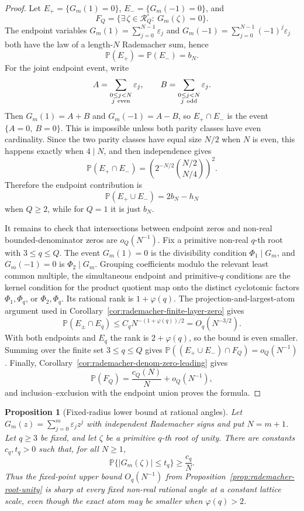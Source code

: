 \documentclass[11pt]{amsart}
\numberwithin{equation}{section}
\newtheorem{proposition}[theorem]{Proposition}
\theoremstyle{definition}
\theoremstyle{remark}
\newcommand{\Prob}{\mathbb P}
\newcommand{\abs}[1]{\left\lvert #1\right\rvert}
\begin{document}
\begin{proof}
Let \(E_+=\{G_m(1)=0\}\), \(E_-=\{G_m(-1)=0\}\), and
\[
  F_Q=\{\exists\,\zeta\in\mathcal R_Q^\circ:\ G_m(\zeta)=0\}.
\]
The endpoint variables \(G_m(1)=\sum_{j=0}^{N-1}\varepsilon_j\) and
\(G_m(-1)=\sum_{j=0}^{N-1}(-1)^j\varepsilon_j\) both have the law of a
length-\(N\) Rademacher sum, hence
\[
  \Prob(E_+)=\Prob(E_-)=b_N.
\]
For the joint endpoint event, write
\[
  A=\sum_{\substack{0\le j<N\\ j\ {\rm even}}}\varepsilon_j,\qquad
  B=\sum_{\substack{0\le j<N\\ j\ {\rm odd}}}\varepsilon_j .
\]
Then \(G_m(1)=A+B\) and \(G_m(-1)=A-B\), so \(E_+\cap E_-\) is the event
\(\{A=0,\ B=0\}\).  This is impossible unless both parity classes have even
cardinality.  Since the two parity classes have equal size \(N/2\) when \(N\)
is even, this happens exactly when \(4\mid N\), and then independence gives
\[
  \Prob(E_+\cap E_-)
  =\left(2^{-N/2}\binom{N/2}{N/4}\right)^2.
\]
Therefore the endpoint contribution is
\[
  \Prob(E_+\cup E_-)
  =2b_N-h_N
\]
when \(Q\ge2\), while for \(Q=1\) it is just \(b_N\).

It remains to check that intersections between endpoint zeros and non-real
bounded-denominator zeros are \(o_Q(N^{-1})\).  Fix a primitive non-real
\(q\)-th root with \(3\le q\le Q\).  The event \(G_m(1)=0\) is the divisibility
condition \(\Phi_1\mid G_m\), and \(G_m(-1)=0\) is \(\Phi_2\mid G_m\).  Grouping
coefficients modulo the relevant least common multiple, the simultaneous
endpoint and primitive-\(q\) conditions are the kernel condition for the product
quotient map onto the distinct cyclotomic factors \(\Phi_1,\Phi_q\), or
\(\Phi_2,\Phi_q\).  Its rational rank is \(1+\varphi(q)\).  The
projection-and-largest-atom argument used in
Corollary~\ref{cor:rademacher-finite-layer-zero} gives
\[
  \Prob(E_\pm\cap E_q)\le C_q N^{-(1+\varphi(q))/2}=O_q(N^{-3/2}).
\]
With both endpoints and \(E_q\) the rank is \(2+\varphi(q)\), so the bound is
even smaller.  Summing over the finite set \(3\le q\le Q\) gives
\(\Prob((E_+\cup E_-)\cap F_Q)=o_Q(N^{-1})\).  Finally,
Corollary~\ref{cor:rademacher-denom-zero-leading} gives
\[
  \Prob(F_Q)=\frac{c_Q(N)}{N}+o_Q(N^{-1}),
\]
and inclusion--exclusion with the endpoint union proves the formula.
\end{proof}

\begin{proposition}[Fixed-radius lower bound at rational angles]
\label{prop:rademacher-root-fixed-radius-lower}
Let \(G_m(z)=\sum_{j=0}^m\varepsilon_jz^j\) with independent Rademacher signs
and put \(N=m+1\).  Let \(q\ge3\) be fixed, and let \(\zeta\) be a primitive
\(q\)-th root of unity.  There are constants \(c_q,t_q>0\) such that, for all
\(N\ge1\),
\[
  \Prob\{\abs{G_m(\zeta)}\le t_q\}\ge \frac{c_q}{N}.
\]
Thus the fixed-point upper bound \(O_q(N^{-1})\) from
Proposition~\ref{prop:rademacher-root-unity} is sharp at every fixed non-real
rational angle at a constant lattice scale, even though the exact atom may be
smaller when \(\varphi(q)>2\).
\end{proposition}
\end{document}
